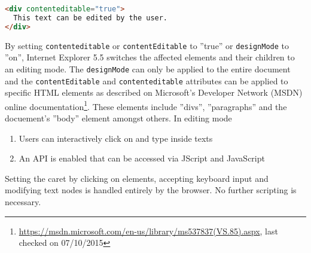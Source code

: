 \begin{table}[]
\centering
{}
\caption{Editing API attributes}
\label{table:editing-api-attributes}
\end{table}

\begin{lstlisting}[language=html, caption=An element set to editing mode, label=lst:div-contenteditable]
<div contenteditable="true">
  This text can be edited by the user.
</div>
\end{lstlisting}

By setting \texttt{contenteditable} or \texttt{contentEditable} to ''true'' or \texttt{designMode} to ''on'', Internet Explorer 5.5 switches the affected elements and their children to an editing mode. The \texttt{designMode} can only be applied to the entire document and the \texttt{contentEditable} and \texttt{contenteditable} attributes can be applied to specific HTML elements as described on Microsoft's Developer Network (MSDN) online documentation\footnote{\url{https://msdn.microsoft.com/en-us/library/ms537837(VS.85).aspx}, last checked on 07/10/2015}. These elements include ''divs'', ''paragraphs'' and the docuement's ''body'' element amongst others. In editing mode

\begin{enumerate} \item Users can interactively click on and type inside texts \item An API is enabled that can be accessed via JScript and JavaScript\end{enumerate}

Setting the caret by clicking on elements, accepting keyboard input and modifying text nodes is handled entirely by the browser. No further scripting is necessary.

